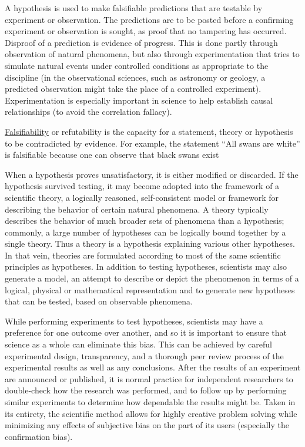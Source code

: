 \documentclass[
]{article}
\begin{document}
A hypothesis is used to make falsifiable predictions that are testable
by experiment or observation. The predictions are to be posted before a
confirming experiment or observation is sought, as proof that no
tampering has occurred. Disproof of a prediction is evidence of
progress. This is done partly through observation of natural phenomena,
but also through experimentation that tries to simulate natural events
under controlled conditions as appropriate to the discipline (in the
observational sciences, such as astronomy or geology, a predicted
observation might take the place of a controlled experiment).
Experimentation is especially important in science to help establish
causal relationships (to avoid the correlation fallacy).

\href{https://en.wikipedia.org/wiki/Falsifiability}{Falsifiability} or
refutability is the capacity for a statement, theory or hypothesis to be
contradicted by evidence. For example, the statement ``All swans are
white'' is falsifiable because one can observe that black swans exist

When a hypothesis proves unsatisfactory, it is either modified or
discarded. If the hypothesis survived testing, it may become adopted
into the framework of a scientific theory, a logically reasoned,
self-consistent model or framework for describing the behavior of
certain natural phenomena. A theory typically describes the behavior of
much broader sets of phenomena than a hypothesis; commonly, a large
number of hypotheses can be logically bound together by a single theory.
Thus a theory is a hypothesis explaining various other hypotheses. In
that vein, theories are formulated according to most of the same
scientific principles as hypotheses. In addition to testing hypotheses,
scientists may also generate a model, an attempt to describe or depict
the phenomenon in terms of a logical, physical or mathematical
representation and to generate new hypotheses that can be tested, based
on observable phenomena.

While performing experiments to test hypotheses, scientists may have a
preference for one outcome over another, and so it is important to
ensure that science as a whole can eliminate this bias. This can be
achieved by careful experimental design, transparency, and a thorough
peer review process of the experimental results as well as any
conclusions. After the results of an experiment are announced or
published, it is normal practice for independent researchers to
double-check how the research was performed, and to follow up by
performing similar experiments to determine how dependable the results
might be. Taken in its entirety, the scientific method allows for highly
creative problem solving while minimizing any effects of subjective bias
on the part of its users (especially the confirmation bias).
\end{document}
